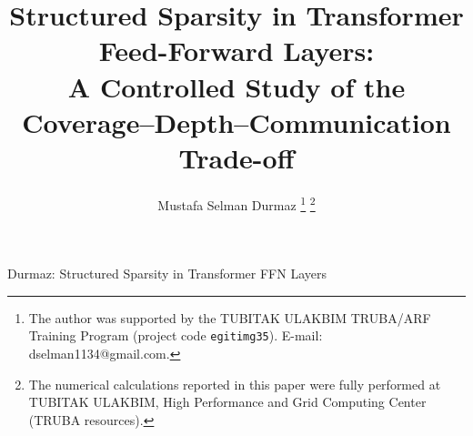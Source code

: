 \documentclass[10pt,journal]{IEEEtran}
\begin{document}
\title{Structured Sparsity in Transformer Feed-Forward Layers:\\
A Controlled Study of the Coverage--Depth--Communication Trade-off}

\author{Mustafa Selman Durmaz%
\thanks{The author was supported by the TUBITAK ULAKBIM TRUBA/ARF Training Program
(project code \texttt{egitimg35}). E-mail: dselman1134@gmail.com.}%
\thanks{The numerical calculations reported in this paper were fully performed at TUBITAK
ULAKBIM, High Performance and Grid Computing Center (TRUBA resources).}}

%
{Durmaz: Structured Sparsity in Transformer FFN Layers}

\maketitle
\end{document}

